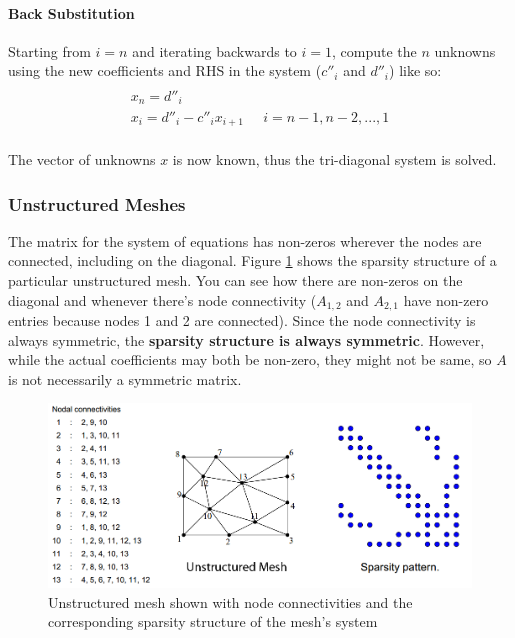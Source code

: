 \documentclass{article}
\begin{document}
\paragraph{\textbf{Back Substitution}} Starting from $i = n$ and iterating backwards to $i = 1$, compute the $n$ unknowns using the new coefficients and RHS in the system ($c''_i$ and $d''_i$) like so:
\begin{multline}\\
	x_n = d''_i \\
	x_i = d''_i - c''_i x_{i+1} \;\;\;\;\; i = n-1,n-2,...,1
\\ \end{multline}

The vector of unknowns $x$ is now known, thus the tri-diagonal system is solved.

\subsubsection{Unstructured Meshes}

The matrix for the system of equations has non-zeros wherever the nodes are connected, including on the diagonal. Figure \ref{fig:unstructured-mesh-sparsity} shows the sparsity structure of a particular unstructured mesh. You can see how there are non-zeros on the diagonal and whenever there's node connectivity ($A_{1,2}$ and $A_{2,1}$ have non-zero entries because nodes 1 and 2 are connected). Since the node connectivity is always symmetric, the \textbf{sparsity structure is always symmetric}. However, while the actual coefficients may both be non-zero, they might not be same, so $A$ is not necessarily a symmetric matrix.
\begin{figure}
	\centering
	\includegraphics[scale=0.4]{figures/unstructurered-sparsity-structure.png}
	\caption{Unstructured mesh shown with node connectivities and the corresponding sparsity structure of the mesh's system}
	\label{fig:unstructured-mesh-sparsity}
\end{figure}
\end{document}
